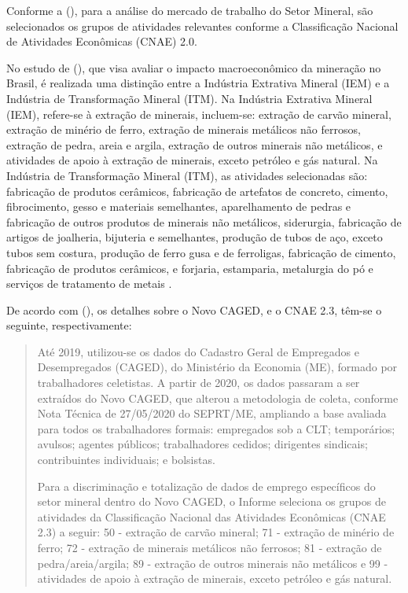 Conforme a \citeauthor{anm2023informe3} (\citeyear{anm2023informe3}), para a análise do mercado de trabalho do Setor Mineral, são selecionados os grupos de atividades relevantes conforme a Classificação Nacional de Atividades Econômicas (CNAE) 2.0.

No estudo de \citeauthor{rocha2020impacto} (\citeyear{rocha2020impacto}), que visa avaliar o impacto macroeconômico da mineração no Brasil, é realizada uma distinção entre a Indústria Extrativa Mineral (IEM) e a Indústria de Transformação Mineral (ITM). Na Indústria Extrativa Mineral (IEM), refere-se à extração de minerais, incluem-se: extração de carvão mineral, extração de minério de ferro, extração de minerais metálicos não ferrosos, extração de pedra, areia e argila, extração de outros minerais não metálicos, e atividades de apoio à extração de minerais, exceto petróleo e gás natural. Na Indústria de Transformação Mineral (ITM), as atividades selecionadas são: fabricação de produtos cerâmicos, fabricação de artefatos de concreto, cimento, fibrocimento, gesso e materiais semelhantes, aparelhamento de pedras e fabricação de outros produtos de minerais não metálicos, siderurgia, fabricação de artigos de joalheria, bijuteria e semelhantes, produção de tubos de aço, exceto tubos sem costura, produção de ferro gusa e de ferroligas, fabricação de cimento, fabricação de produtos cerâmicos, e forjaria, estamparia, metalurgia do pó e serviços de tratamento de metais \cite{anm2023informe3}.

De acordo com \citeauthor{anm2023anuario} (\citeyear{anm2023anuario}), os detalhes sobre o Novo CAGED, e o CNAE 2.3, têm-se o seguinte, respectivamente:

\begin{quotation}
Até 2019, utilizou-se os dados do Cadastro Geral de Empregados e
Desempregados (CAGED), do Ministério da Economia (ME), formado por
trabalhadores celetistas. A partir de 2020, os dados passaram a ser
extraídos do Novo CAGED, que alterou a metodologia de coleta, conforme
Nota Técnica de 27/05/2020 do SEPRT/ME, ampliando a base avaliada para
todos os trabalhadores formais: empregados sob a CLT; temporários;
avulsos; agentes públicos; trabalhadores cedidos; dirigentes
sindicais; contribuintes individuais; e bolsistas.

Para a discriminação e totalização de dados de emprego específicos do
setor mineral dentro do Novo CAGED, o Informe seleciona os grupos de
atividades da Classificação Nacional das Atividades Econômicas (CNAE
2.3) a seguir: 50 - extração de carvão mineral; 71 - extração de
minério de ferro; 72 - extração de minerais metálicos não ferrosos;
81 - extração de pedra/areia/argila; 89 - extração de outros minerais
não metálicos e 99 - atividades de apoio à extração de minerais,
exceto petróleo e gás natural.
\end{quotation}

